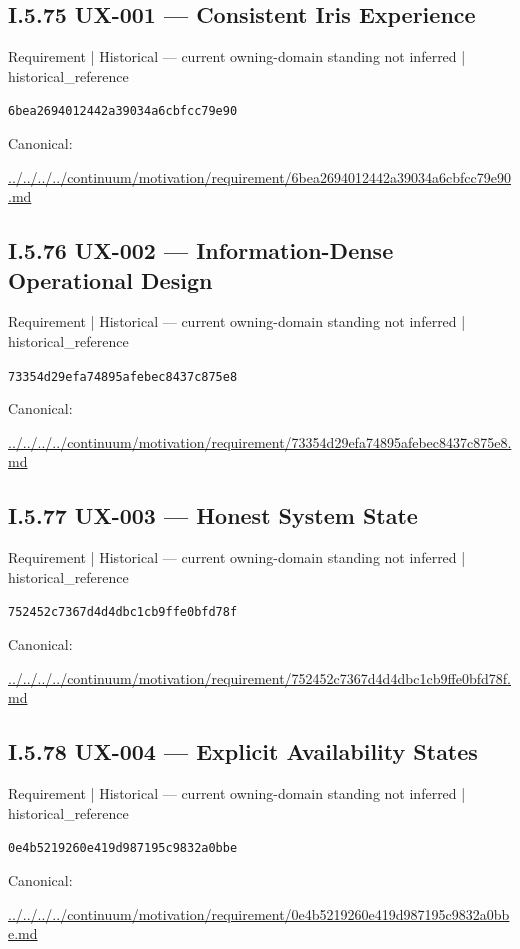 \documentclass[10pt,a4paper]{article}
\begin{document}
\subsection*{I.5.75 UX-001 — Consistent Iris Experience}
{\small Requirement | Historical — current owning-domain standing not inferred | historical\_reference}\par
\texttt{6bea2694012442a39034a6cbfcc79e90}\par
Canonical: \par
{\footnotesize\url{../../../../continuum/motivation/requirement/6bea2694012442a39034a6cbfcc79e90.md}}\par
\subsection*{I.5.76 UX-002 — Information-Dense Operational Design}
{\small Requirement | Historical — current owning-domain standing not inferred | historical\_reference}\par
\texttt{73354d29efa74895afebec8437c875e8}\par
Canonical: \par
{\footnotesize\url{../../../../continuum/motivation/requirement/73354d29efa74895afebec8437c875e8.md}}\par
\subsection*{I.5.77 UX-003 — Honest System State}
{\small Requirement | Historical — current owning-domain standing not inferred | historical\_reference}\par
\texttt{752452c7367d4d4dbc1cb9ffe0bfd78f}\par
Canonical: \par
{\footnotesize\url{../../../../continuum/motivation/requirement/752452c7367d4d4dbc1cb9ffe0bfd78f.md}}\par
\subsection*{I.5.78 UX-004 — Explicit Availability States}
{\small Requirement | Historical — current owning-domain standing not inferred | historical\_reference}\par
\texttt{0e4b5219260e419d987195c9832a0bbe}\par
Canonical: \par
{\footnotesize\url{../../../../continuum/motivation/requirement/0e4b5219260e419d987195c9832a0bbe.md}}\par
\end{document}

